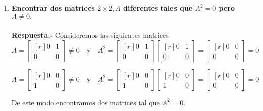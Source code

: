 
\begin{enumerate}

    \item \textbf{\boldmath Encontrar dos matrices $2\times 2,A$ diferentes tales que $A^2=0$ pero $A\neq 0.$\\\\
	Respuesta.-}\; Consideremos las siguientes matrices
	$$
	A=\begin{bmatrix*}[r]
		0 & 1\\
		0 & 0
	    \end{bmatrix*}\neq 0 \quad \mbox{y}\quad A^2=
	    \begin{bmatrix*}[r]
		0 & 1\\
		0 & 0
	    \end{bmatrix*}
	    \begin{bmatrix*}[r]
		0 & 1\\
		0 & 0
	    \end{bmatrix*} = 
	    \begin{bmatrix*}[r]
		0 & 0\\
		0 & 0
	    \end{bmatrix*} = 0
	    $$

	$$
	A=\begin{bmatrix*}[r]
		0 & 0\\
		1 & 0
	    \end{bmatrix*}\neq 0 \quad \mbox{y}\quad A^2=
	    \begin{bmatrix*}[r]
		0 & 0\\
		1 & 0
	    \end{bmatrix*}
	    \begin{bmatrix*}[r]
		0 & 0\\
		1 & 0
	    \end{bmatrix*} = 
	    \begin{bmatrix*}[r]
		0 & 0\\
		0 & 0
	    \end{bmatrix*} = 0
	    $$

	De este modo encontramos dos matrices tal que $A^2=0$.\\\\



\end{enumerate}
